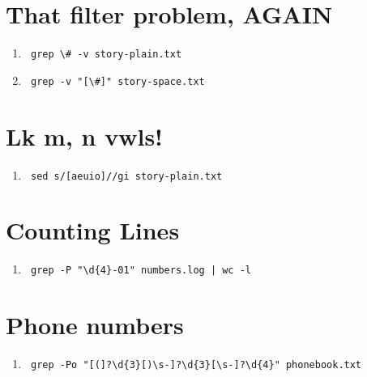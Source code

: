 \documentclass{article}
\begin{document}
\section{That filter problem, AGAIN}
\begin{enumerate}
    \item \begin{verbatim} grep \# -v story-plain.txt \end{verbatim}
    \item \begin{verbatim} grep -v "[\#]" story-space.txt \end{verbatim}
\end{enumerate}

\section{Lk m, n vwls!}
\begin{enumerate}
    \item \begin{verbatim} sed s/[aeuio]//gi story-plain.txt \end{verbatim}
\end{enumerate}

\section{Counting Lines}
\begin{enumerate}
    \item \begin{verbatim} grep -P "\d{4}-01" numbers.log | wc -l \end{verbatim}
\end{enumerate}

\section{Phone numbers}
\begin{enumerate}
    \item \begin{verbatim} grep -Po "[(]?\d{3}[)\s-]?\d{3}[\s-]?\d{4}" phonebook.txt \end{verbatim}
\end{enumerate}
\end{document}
